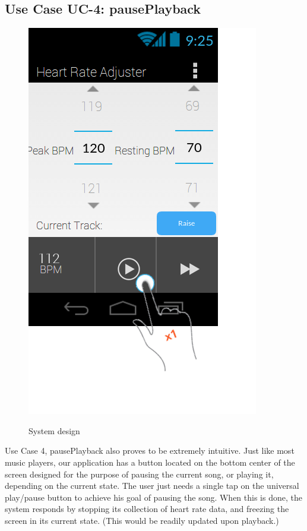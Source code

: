 \documentclass[letterpaper,english, 12pt]{scrreprt}
\begin{document}
\subsection{Use Case UC-4: pausePlayback}

\begin{figure}[H]
	\centering
	\includegraphics{img/Prelim_Design/PrelimDesign_3.png}\\
	\caption{System design}
\end{figure}

Use Case 4, pausePlayback also proves to be extremely intuitive. Just like most music players, our application has a button located on the bottom center of the screen designed for the purpose of pausing the current song, or playing it, depending on the current state. The user just needs a single tap on the universal play/pause button to achieve his goal of pausing the song. When this is done, the system responds by stopping its collection of heart rate data, and freezing the screen in its current state. (This would be readily updated upon playback.)
\end{document}
